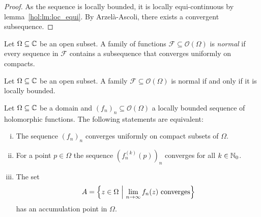 \begin{proof}
As the sequence is locally bounded, it is locally equi-continuous
by lemma~\ref{hol:lm:loc_equi}. By Arzelà-Ascoli, there exists a
convergent subsequence.
\end{proof}

\begin{definicija}
Let $\Omega \subseteq \mathbb{C}$ be an open subset. A family of functions
$\mathcal{F} \subseteq \mathcal{O}(\Omega)$ is
\emph{normal} if every sequence in
$\mathcal{F}$ contains a subsequence that converges uniformly on
compacts.
\end{definicija}

\begin{izrek}[Montel]
Let $\Omega \subseteq \mathbb{C}$ be an open subset. A family
$\mathcal{F} \subseteq \mathcal{O}(\Omega)$ is normal if and only
if it is locally bounded.
\end{izrek}

\obvs


\begin{izrek}[Vitali]
Let $\Omega \subseteq \mathbb{C}$ be a domain and
$(f_n)_n \subseteq \mathcal{O}(\Omega)$ a locally bounded sequence
of holomorphic functions. The following statements are equivalent:

\begin{enumerate}[i)]
\item The sequence $(f_n)_n$ converges uniformly on compact subsets
of $\Omega$.
\item For a point $p \in \Omega$ the sequence $(f_n^{(k)}(p))_n$
converges for all $k \in \mathbb{N}_0$.
\item The set
\[
A =
\left\{z \in \Omega~\middle\vert~\lim_{n \to \infty} f_n(z)~\text{converges}\right\}
\]
has an accumulation point in $\Omega$.
\end{enumerate}
\end{izrek}

